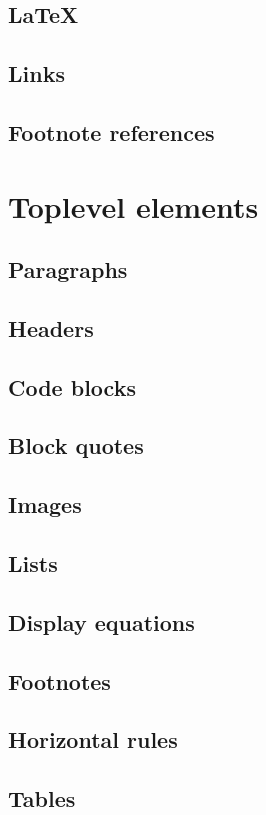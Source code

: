     \subsection{\LaTeX}
    \subsection{Links}
    \subsection{Footnote references}
    \section{Toplevel elements}
    \subsection{Paragraphs}
    \subsection{Headers}
    \subsection{Code blocks}
    \subsection{Block quotes}
    \subsection{Images}
    \subsection{Lists}
    \subsection{Display equations}
    \subsection{Footnotes}
    \subsection{Horizontal rules}
    \subsection{Tables}
